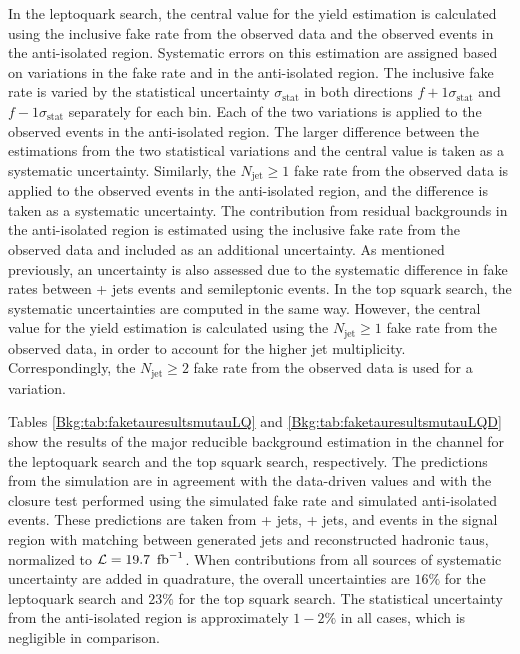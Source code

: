 In the leptoquark search, the central value for the yield estimation is calculated using the inclusive fake rate from the observed data and the observed events in the anti-isolated region. Systematic errors on this estimation are assigned based on variations in the fake rate and in the anti-isolated region. The inclusive fake rate is varied by the statistical uncertainty $\sigma_{\text{stat}}$ in both directions $f+1\sigma_{\text{stat}}$ and $f-1\sigma_{\text{stat}}$ separately for each bin. Each of the two variations is applied to the observed events in the anti-isolated region. The larger difference between the estimations from the two statistical variations and the central value is taken as a systematic uncertainty. Similarly, the $N_{\text{jet}} \geq 1$ fake rate from the observed data is applied to the observed events in the anti-isolated region, and the difference is taken as a systematic uncertainty. The contribution from residual backgrounds in the anti-isolated region is estimated using the inclusive fake rate from the observed data and included as an additional uncertainty. As mentioned previously, an uncertainty is also assessed due to the systematic difference in fake rates between \Zmm + jets events and semileptonic \ttbar events. In the top squark search, the systematic uncertainties are computed in the same way. However, the central value for the yield estimation is calculated using the $N_{\text{jet}} \geq 1$ fake rate from the observed data, in order to account for the higher jet multiplicity. Correspondingly, the $N_{\text{jet}} \geq 2$ fake rate from the observed data is used for a variation.

Tables \ref{Bkg:tab:faketauresultsmutauLQ} and \ref{Bkg:tab:faketauresultsmutauLQD} show the results of the major reducible background estimation in the \mutau channel for the leptoquark search and the top squark search, respectively. The predictions from the simulation are in agreement with the data-driven values and with the closure test performed using the simulated fake rate and simulated anti-isolated events. These predictions are taken from \W + jets, \Z + jets, and \ttbar events in the signal region with matching between generated jets and reconstructed hadronic taus, normalized to $\mathcal{L} = 19.7~\mbox{\ensuremath{\,\text{fb}^\text{$-$1}}}$. When contributions from all sources of systematic uncertainty are added in quadrature, the overall uncertainties are $16\%$ for the leptoquark search and $23\%$ for the top squark search. The statistical uncertainty from the anti-isolated region is approximately $1-2\%$ in all cases, which is negligible in comparison.


